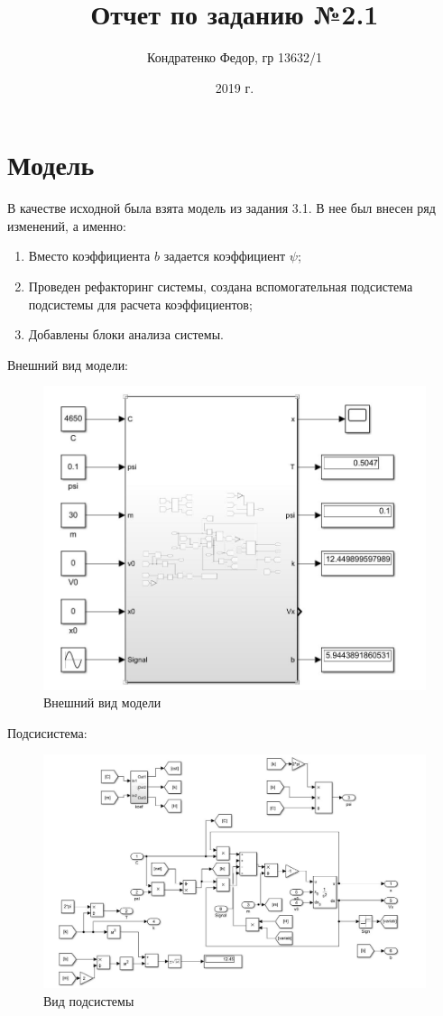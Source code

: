 \documentclass{article}
\date{2019 г.}
\author{Кондратенко Федор, гр 13632/1}
\title{Отчет по заданию №2.1}
\begin{document}
	\maketitle
	\section*{Модель}
	В качестве исходной была взята модель из задания 3.1. В нее был внесен ряд изменений, а именно:
	\begin{enumerate}
		\item Вместо коэффициента $b$ задается коэффициент $\psi$;
		\item Проведен рефакторинг системы, создана вспомогательная подсистема подсистемы для расчета коэффициентов;
		\item Добавлены блоки анализа системы.
	\end{enumerate}
	Внешний вид модели:
	\begin{figure}[H]
		\centering
		\includegraphics[width=0.7\linewidth]{model_outdoor}
		\caption{Внешний вид модели}
		\label{fig:modeloutdoor}
	\end{figure}
	Подсисистема:
	\begin{figure}[H]
		\centering
		\includegraphics[width=1.1\linewidth]{model_all}
		\caption{Вид подсистемы}
		\label{fig:modelall}
	\end{figure}
\end{document}
